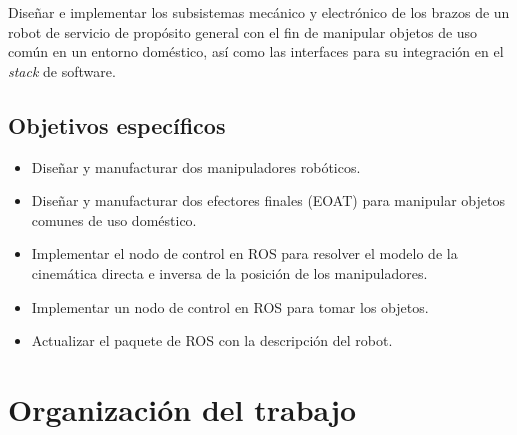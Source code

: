 Diseñar e implementar los subsistemas mecánico y electr\'onico de los brazos de un robot de servicio de prop\'osito general con el fin de manipular objetos de uso com\'un en un entorno dom\'estico, así como las interfaces para su integraci\'on en el \emph{stack} de software.

\subsection{Objetivos espec\'ificos}

\begin{itemize}
    \item Diseñar y manufacturar dos manipuladores rob\'oticos.
    \item Diseñar y manufacturar dos efectores finales (EOAT) para manipular objetos comunes de uso doméstico.
    \item Implementar el nodo de control en ROS para resolver el modelo de la cinem\'atica directa e inversa de la posición de los manipuladores.
    \item Implementar un nodo de control en ROS para tomar los objetos.
    \item Actualizar el paquete de ROS con la descripci\'on del robot.
\end{itemize}

\section{Organización del trabajo}